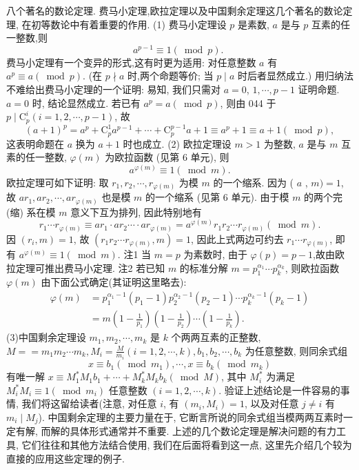 
八个著名的数论定理.
费马小定理,欧拉定理以及中国剩余定理这几个著名的数论定理, 在初等数论中有着重要的作用.
(1) 费马小定理设 $p$ 是素数, $a$ 是与 $p$ 互素的任一整数,则
$$
a^{p-1} \equiv 1(\bmod p) \text {. }
$$
费马小定理有一个变异的形式,这有时更为适用:
对任意整数 $a$ 有 $a^p \equiv a(\bmod p)$.
(在 $p \nmid a$ 时,两个命题等价; 当 $p \mid a$ 时后者显然成立.)
用归纳法不难给出费马小定理的一个证明: 易知, 我们只需对 $a=0$, $1, \cdots, p-1$ 证明命题.
$a=0$ 时, 结论显然成立.
若已有 $a^p=a(\bmod p)$, 则由
044 于 $p \mid \mathrm{C}_p^i(i=1,2, \cdots, p-1)$, 故
$$
(a+1)^p=a^p+\mathrm{C}_p^1 a^{p-1}+\cdots+\mathrm{C}_p^{p-1} a+1 \equiv a^p+1 \equiv a+1(\bmod p),
$$
这表明命题在 $a$ 换为 $a+1$ 时也成立.
(2) 欧拉定理设 $m>1$ 为整数, $a$ 是与 $m$ 互素的任一整数, $\varphi(m)$ 为欧拉函数 (见第 6 单元), 则
$$
a^{\varphi(m)} \equiv 1(\bmod m) .
$$
欧拉定理可如下证明: 取 $r_1, r_2, \cdots, r_{\varphi(m)}$ 为模 $m$ 的一个缩系.
因为 ( $a$ , $m)=1$, 故 $a r_1, a r_2, \cdots, a r_{\varphi(m)}$ 也是模 $m$ 的一个缩系 (见第 6 单元). 由于模 $m$ 的两个完 (缩) 系在模 $m$ 意义下互为排列, 因此特别地有
$$
r_1 \cdots r_{\varphi(m)} \equiv a r_1 \cdot a r_2 \cdots \cdot a r_{\varphi(m)}=a^{\varphi(m)} r_1 r_2 \cdots r_{\varphi(m)}(\bmod m) .
$$
因 $\left(r_i, m\right)=1$, 故 $\left(r_1 r_2 \cdots r_{\varphi(m)}, m\right)=1$, 因此上式两边可约去 $r_1 \cdots r_{\varphi(m)}$, 即有 $a^{\varphi(m)} \equiv 1(\bmod m)$.
注1 当 $m=p$ 为素数时, 由于 $\varphi(p)=p-1$,故由欧拉定理可推出费马小定理.
注2 若已知 $m$ 的标准分解 $m=p_1^{\alpha_1} \cdots p_k^{\alpha_k}$, 则欧拉函数 $\varphi(m)$ 由下面公式确定(其证明这里略去):
$$
\begin{aligned}
\varphi(m) & =p_1^{\alpha_1-1}\left(p_1-1\right) p_2^{\alpha_2-1}\left(p_2-1\right) \cdots p_k^{\alpha_k-1}\left(p_k-1\right) \\
& =m\left(1-\frac{1}{p_1}\right)\left(1-\frac{1}{p_2}\right) \cdots\left(1-\frac{1}{p_k}\right) .
\end{aligned}
$$
(3)中国剩余定理设 $m_1, m_2, \cdots, m_k$ 是 $k$ 个两两互素的正整数, $M== m_1 m_2 \cdots m_k, M_i=\frac{M}{m_i}(i=1,2, \cdots, k), b_1, b_2, \cdots, b_k$ 为任意整数, 则同余式组
$$
x \equiv b_1\left(\bmod m_1\right), \cdots, x \equiv b_k\left(\bmod m_k\right)
$$
有唯一解 $x \equiv M_1^* M_1 b_1+\cdots+M_k^* M_k b_k(\bmod M)$, 其中 $M_i^*$ 为满足 $M_i^* M_i \equiv 1\left(\bmod m_i\right)$ 任意整数 $(i=1,2, \cdots, k)$.
验证上述结论是一件容易的事情, 我们将这留给读者(注意, 对任意 $i$, 有 $\left(m_i, M_i\right)=1$, 以及对任意 $j \neq i$ 有 $m_i \mid M_j$). 中国剩余定理的主要力量在于, 它断言所说的同余式组当模两两互素时一定有解, 而解的具体形式通常并不重要.
上述的几个数论定理是解决问题的有力工具, 它们往往和其他方法结合使用, 我们在后面将看到这一点, 这里先介绍几个较为直接的应用这些定理的例子.



